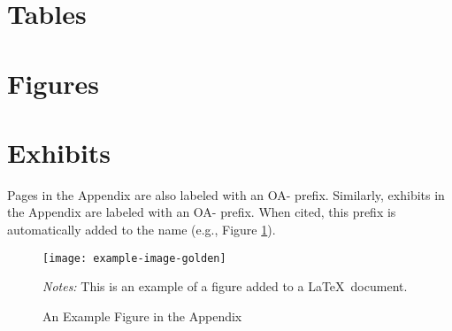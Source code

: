 \documentclass[11 pt]{article}
\begin{document}
\section*{Tables}

%
\newpage
\section*{Figures}


\newpage
\appendix
{}


\newpage
\doublespacing
{}

\section{Exhibits}
\label{sec_app:ex}
%
Pages in the Appendix are also labeled with an OA- prefix. Similarly, exhibits in the Appendix are labeled with an OA- prefix. When cited, this prefix is automatically added to the name (e.g., Figure \ref{fig:sample_fig_app}).

\begin{figure}[H]
\caption{An Example Figure in the Appendix}
\label{fig:sample_fig_app}
\vspace{-1em}
\begin{center}
	\texttt{[image: example-image-golden]}
\end{center}

{\footnotesize\textit{Notes:} This is an example of a figure added to a \LaTeX \ document. 
 \par}



\end{figure}
\end{document}
